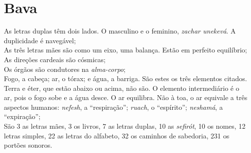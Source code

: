 \chapter*{Bava \smallskip{}}

\begin{center}
{\huge{}}
\end{center}

\noindent{}As letras duplas têm dois lados. O masculino e o feminino, \textit{zachar unekevá}. A duplicidade é navegável;\\

\noindent{}As três letras mães são como um eixo, uma balança. Estão em perfeito equilíbrio;\\

\noindent{}As direções cardeais são cósmicas;\\

\noindent{}Os órgãos são condutores na \textit{alma-corpo};\\

\noindent{}Fogo, a cabeça; ar, o tórax; e água, a barriga. São estes os três elementos citados. Terra e éter, que estão abaixo ou acima, não são. O elemento intermediário é o ar, pois o fogo sobe e a água desce. O ar equilibra. Não à toa, o ar equivale a três aspectos humanos: \textit{nefesh}, a ``respiração''; \textit{ruach}, o ``espírito''; \textit{neshamá}, a ``expiração'';\\

\noindent{}São 3 as letras mães, 3 os livros, 7 as letras duplas, 10 as \textit{sefirót}, 10 os nomes, 12 letras simples, 22 as letras do alfabeto, 32 os caminhos de sabedoria, 231 os portões sonoros. 




